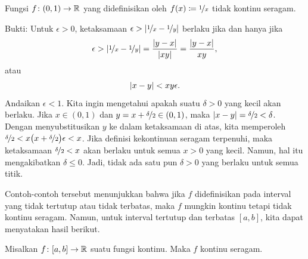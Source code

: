 \begin{example}
Fungsi $f \colon (0,1) \to {\mathbb{R}}$ yang didefinisikan oleh
$f(x) \coloneqq \nicefrac{1}{x}$ tidak kontinu seragam.

Bukti: Untuk $\epsilon > 0$, ketaksamaan $\epsilon >
\left\lvert {\nicefrac{1}{x}-\nicefrac{1}{y}} \right\rvert$ berlaku jika dan hanya jika
\begin{equation*}
\epsilon >
\left\lvert {\nicefrac{1}{x}-\nicefrac{1}{y}} \right\rvert
=
\frac{\lvert {y-x} \rvert}{\lvert {xy} \rvert} 
=
\frac{\lvert {y-x} \rvert}{xy} ,
\end{equation*}
atau
\begin{equation*}
\lvert {x-y} \rvert < xy \epsilon .
\end{equation*}
Andaikan $\epsilon < 1$.
Kita ingin mengetahui apakah suatu $\delta > 0$ yang kecil akan berlaku.
Jika $x \in (0,1)$ dan
$y = x+\nicefrac{\delta}{2} \in (0,1)$,
maka $\lvert {x-y} \rvert = \nicefrac{\delta}{2} < \delta$.
Dengan menyubstitusikan $y$ ke dalam ketaksamaan di atas, kita memperoleh
$\nicefrac{\delta}{2} <
x \bigl( x+\nicefrac{\delta}{2} \bigr) \epsilon < x$.
Jika definisi kekontinuan seragam terpenuhi, maka ketaksamaan
$\nicefrac{\delta}{2} < x$ akan berlaku untuk semua $x > 0$ yang kecil.
Namun, hal itu mengakibatkan $\delta \leq 0$.
Jadi, tidak ada satu pun $\delta > 0$ yang berlaku untuk semua titik.
\end{example}

Contoh-contoh tersebut menunjukkan bahwa jika $f$ didefinisikan pada interval
yang tidak tertutup atau tidak terbatas, maka $f$ mungkin kontinu tetapi tidak
kontinu seragam.  Namun, untuk interval tertutup dan terbatas $[a,b]$, kita
dapat menyatakan hasil berikut.

\begin{thm} \label{unifcont:thm}
Misalkan $f \colon [a,b] \to {\mathbb{R}}$ suatu fungsi kontinu.  Maka $f$
kontinu seragam.
\end{thm}


